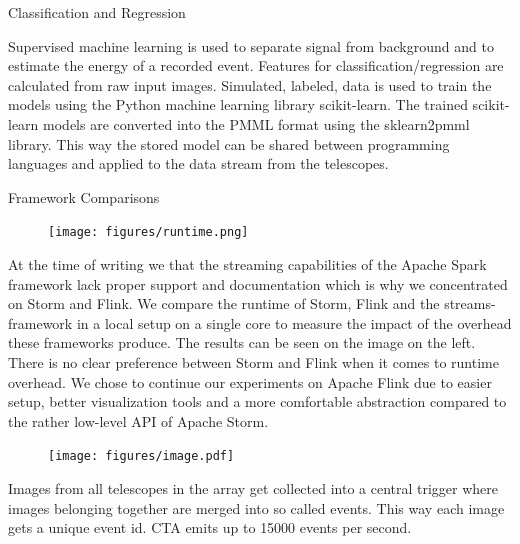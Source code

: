 \begin{multicols}{2}
\begin{block}[equal height group=A]{Classification and Regression}
\begin{multicols}{2}
        Supervised machine learning is used to separate signal from background and to estimate
        the energy of a recorded event. Features for classification/regression are calculated from raw input
        images.
        Simulated, labeled, data is used to train the models using the Python machine learning library scikit-learn\cite{sklearn}.
        The trained scikit-learn models are converted into the PMML\cite{pmml} format using the sklearn2pmml\cite{sklearn2pmml} library.
        This way the stored model can be shared
        between programming languages and applied to the data stream from the telescopes.
      \end{multicols}
    \end{block}%

    \begin{block}[equal height group=A]{Framework Comparisons}%
      \begin{multicols}{2}
        \begin{figure}
          \texttt{[image: figures/runtime.png]}\\
        \end{figure}
        \columnbreak
        At the time of writing we that the streaming capabilities of the Apache Spark framework lack proper support and documentation
        which is why we concentrated on Storm and Flink. We compare the runtime of Storm, Flink and the streams-framework in a local setup on a single
        core to measure the impact of the overhead these frameworks produce. The results can be seen on the image on the left.
        There is no clear preference between Storm and Flink when it comes to runtime overhead. We chose to continue our experiments on
        Apache Flink due to easier setup, better visualization tools and a more comfortable abstraction compared to the rather low-level
        API of Apache Storm.
      \end{multicols}
    \end{block}%


    \columnbreak

        \begin{center}

        \begin{streamblock}[equal height group=C, width=0.8\linewidth]{0mm}{-5mm}{}%
          \begin{multicols}{2}
            \begin{figure}
              \texttt{[image: figures/image.pdf]}
            \end{figure}
            \columnbreak
            Images from all telescopes in the array get collected into a central trigger where images belonging together are merged into so called events.
            This way each image gets a unique event id.
            CTA emits up to \num{15 000} events per second\cite{trigger}.
          \end{multicols}
        \end{streamblock}%


\end{center}
\end{multicols}
